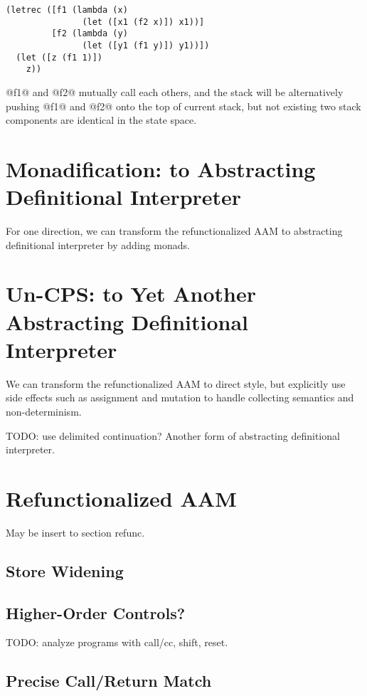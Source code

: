 \documentclass[acmsmall,review,anonymous]{acmart}\settopmatter{printfolios=true,printccs=false,printacmref=false}
\begin{document}
\begin{lstlisting}
(letrec ([f1 (lambda (x) 
               (let ([x1 (f2 x)]) x1))]
         [f2 (lambda (y)
               (let ([y1 (f1 y)]) y1))])
  (let ([z (f1 1)])
    z))
\end{lstlisting}

@f1@ and @f2@ mutually call each others, and the stack will be alternatively
pushing @f1@ and @f2@ onto the top of current stack, but not existing 
two stack components are identical in the state space.

\section{Monadification: to Abstracting Definitional Interpreter}

For one direction, we can transform the refunctionalized AAM to abstracting definitional interpreter
by adding monads.

\section{Un-CPS: to Yet Another Abstracting Definitional Interpreter}

We can transform the refunctionalized AAM to direct style, but explicitly use 
side effects such as assignment and mutation to handle collecting semantics and non-determinism.

TODO: use delimited continuation? 
Another form of abstracting definitional interpreter.

\section{Refunctionalized AAM}

May be insert to section refunc.

\subsection{Store Widening}

\subsection{Higher-Order Controls?}

TODO: analyze programs with call/cc, shift, reset.

\subsection{Precise Call/Return Match}
\end{document}
